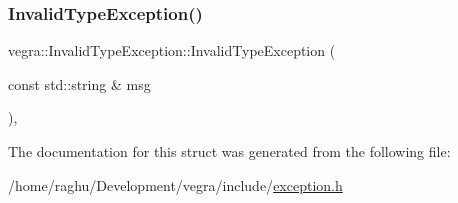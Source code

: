 \subsubsection{\texorpdfstring{Invalid\+Type\+Exception()}{InvalidTypeException()}}
{\footnotesize\ttfamily vegra\+::\+Invalid\+Type\+Exception\+::\+Invalid\+Type\+Exception (\begin{DoxyParamCaption}\item[{const std\+::string \&}]{msg }\end{DoxyParamCaption})\hspace{0.3cm}{\ttfamily [inline]}, {\ttfamily [explicit]}}



The documentation for this struct was generated from the following file\+:\begin{DoxyCompactItemize}
\item 
/home/raghu/\+Development/vegra/include/\mbox{\hyperlink{exception_8h}{exception.\+h}}\end{DoxyCompactItemize}
